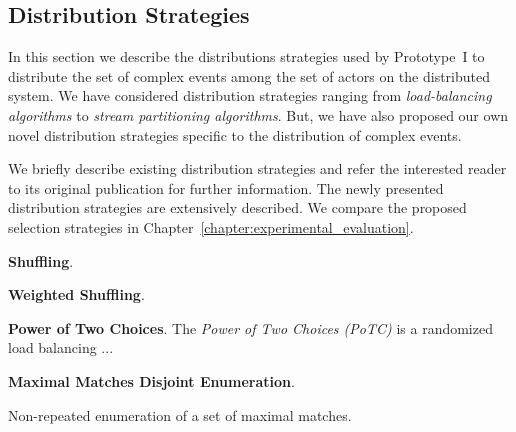 \subsection{Distribution Strategies}\label{subsec:dcere:distribution-strategies}

In this section we describe the distributions strategies used by Prototype~I to distribute the set of complex events among the set of actors on the distributed system. We have considered distribution strategies ranging from \emph{load-balancing algorithms} to \emph{stream partitioning algorithms}. But, we have also proposed our own novel distribution strategies specific to the distribution of complex events.

We briefly describe existing distribution strategies and refer the interested reader to its original publication for further information. The newly presented distribution strategies are extensively described. We compare the proposed selection strategies in Chapter~\ref{chapter:experimental_evaluation}.

\textbf{Shuffling}.

\textbf{Weighted Shuffling}.

\textbf{Power of Two Choices}. The \emph{Power of Two Choices (PoTC)} \cite{load-balancing-1} is a randomized load balancing ...

\textbf{Maximal Matches Disjoint Enumeration}.

\begin{algorithm}[H]
  \DontPrintSemicolon
  \SetAlgoNoEnd %
  \SetAlgoNoLine %
  \LinesNumbered

  \;
\caption{Non-repeated enumeration of a set of maximal matches.}
\label{algo:mmde}
\end{algorithm}

